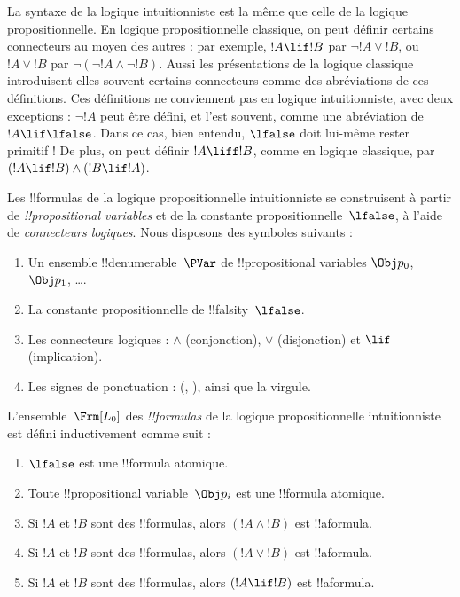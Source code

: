 \documentclass[../../../include/open-logic-section]{subfiles}
\begin{document}


La syntaxe de la logique intuitionniste est la même que celle de la
logique propositionnelle. En logique propositionnelle classique, on
peut définir certains connecteurs au moyen des autres : par exemple,
$!A \lif !B$ par $\lnot !A \lor !B$, ou $!A \lor !B$ par
$\lnot(\lnot !A \land \lnot !B)$. Aussi les présentations de la logique
classique introduisent-elles souvent certains connecteurs comme des
abréviations de ces définitions. Ces définitions ne conviennent pas
en logique intuitionniste, avec deux exceptions : $\lnot !A$ peut
être défini, et l'est souvent, comme une abréviation de
$!A \lif \lfalse$. Dans ce cas, bien entendu, $\lfalse$ doit lui-même
rester primitif !{} De plus, on peut définir $!A \liff !B$, comme
en logique classique, par $(!A \lif !B) \land (!B \lif !A)$.

Les !!{formula}s de la logique propositionnelle intuitionniste
se construisent à partir de \emph{!!{propositional variable}s} et
de la constante propositionnelle~$\lfalse$, à l'aide de
\emph{connecteurs logiques}. Nous disposons des symboles suivants :

\begin{enumerate}
\item Un ensemble !!{denumerable}~$\PVar$ de !!{propositional variable}s
  $\Obj p_0$, $\Obj p_1$, \dots.
\item La constante propositionnelle de !!{falsity}~$\lfalse$.
\item Les connecteurs logiques : $\land$ (conjonction),
  $\lor$ (disjonction) et $\lif$ (implication).
\item Les signes de ponctuation : (, ), ainsi que la virgule.
\end{enumerate}

\begin{defn}[Formule]
 L'ensemble~$\Frm[L_0]$ des
\emph{!!{formula}s} de la logique propositionnelle intuitionniste
est défini inductivement comme suit :
\begin{enumerate}
\item $\lfalse$ est une !!{formula} atomique.

\item Toute !!{propositional variable}~$\Obj p_i$ est une
  !!{formula} atomique.

\item Si $!A$ et $!B$ sont des !!{formula}s, alors $(!A \land !B)$
  est !!a{formula}.

\item Si $!A$ et $!B$ sont des !!{formula}s, alors $(!A \lor !B)$
  est !!a{formula}.

\item Si $!A$ et $!B$ sont des !!{formula}s, alors $(!A \lif !B)$
  est !!a{formula}.

\end{enumerate}
\end{defn}
\end{document}
